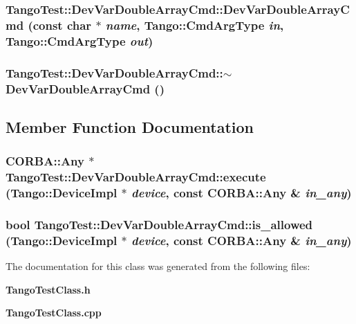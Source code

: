 \subsubsection{\setlength{\rightskip}{0pt plus 5cm}Tango\-Test::Dev\-Var\-Double\-Array\-Cmd::Dev\-Var\-Double\-Array\-Cmd (const char $\ast$ {\em name}, Tango::Cmd\-Arg\-Type {\em in}, Tango::Cmd\-Arg\-Type {\em out})}\label{classTangoTest_1_1DevVarDoubleArrayCmd_a1}


\subsubsection{\setlength{\rightskip}{0pt plus 5cm}Tango\-Test::Dev\-Var\-Double\-Array\-Cmd::$\sim$Dev\-Var\-Double\-Array\-Cmd ()\hspace{0.3cm}{\tt  [inline]}}\label{classTangoTest_1_1DevVarDoubleArrayCmd_a2}




\subsection{Member Function Documentation}
\subsubsection{\setlength{\rightskip}{0pt plus 5cm}CORBA::Any $\ast$ Tango\-Test::Dev\-Var\-Double\-Array\-Cmd::execute (Tango::Device\-Impl $\ast$ {\em device}, const CORBA::Any \& {\em in\_\-any})\hspace{0.3cm}{\tt  [virtual]}}\label{classTangoTest_1_1DevVarDoubleArrayCmd_a4}


\subsubsection{\setlength{\rightskip}{0pt plus 5cm}bool Tango\-Test::Dev\-Var\-Double\-Array\-Cmd::is\_\-allowed (Tango::Device\-Impl $\ast$ {\em device}, const CORBA::Any \& {\em in\_\-any})\hspace{0.3cm}{\tt  [virtual]}}\label{classTangoTest_1_1DevVarDoubleArrayCmd_a3}




The documentation for this class was generated from the following files:\begin{CompactItemize}
\item 
{\bf Tango\-Test\-Class.h}\item 
{\bf Tango\-Test\-Class.cpp}\end{CompactItemize}

